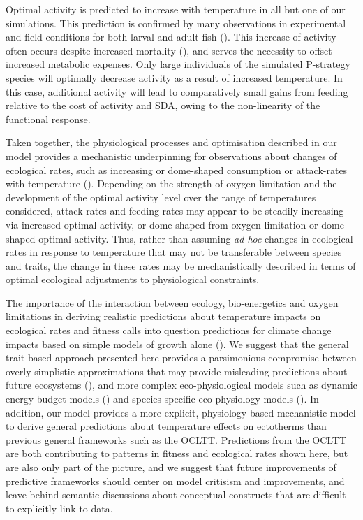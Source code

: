 \documentclass[a4paper, toc=index,abstract=true]{scrartcl}\usepackage[]{graphicx}\usepackage[]{color}
\begin{document}
\begin{spacing}{1.9}
Optimal activity is predicted to increase with temperature in all but one of our simulations. This prediction is confirmed by many observations in experimental and field conditions for both larval and adult fish (\cite{sswat_growth_2018,brown_feeding_1989,claireaux_physiology_1995, biro_mechanisms_2007}). This increase of activity often occurs despite increased mortality (\cite[e.g., ][]{sswat_growth_2018, biro_mechanisms_2007}), and serves the necessity to offset increased metabolic expenses. Only large individuals of the simulated P-strategy species will optimally decrease activity as a result of increased temperature. In this case, additional activity will lead to comparatively small gains from feeding relative to the cost of activity and SDA, owing to the non-linearity of the functional response.


Taken together, the physiological processes and optimisation described in our model provides a mechanistic underpinning for observations about changes of ecological rates, such as
increasing or dome-shaped consumption or attack-rates with temperature
(\cite{biro_mechanisms_2007,englund_temperature_2011,rall_universal_2012}). Depending on the
strength of oxygen limitation and the development of the optimal
activity level over the range of temperatures considered, attack rates
and feeding rates may appear to be steadily increasing via increased
optimal activity, or dome-shaped from oxygen limitation or dome-shaped
optimal activity. Thus, rather than assuming \emph{ad hoc} changes in ecological rates in response to temperature that may not be transferable between species and traits, the change in these rates may be mechanistically described in terms of optimal ecological adjustments to physiological constraints.

The importance of the interaction between ecology, bio-energetics and oxygen limitations in deriving realistic predictions about temperature impacts on ecological rates and fitness calls into question predictions for climate change impacts based on simple models of growth alone (\cite{cheung_shrinking_2013, pauly_sound_2017}). We suggest that the general trait-based approach presented here provides a parsimonious compromise between overly-simplistic approximations that may provide misleading predictions about future ecosystems (\cite{brander_overconfidence_2013, lefevre_models_2017}), and more complex eco-physiological models such as dynamic energy budget models (\cite[e.g., ][]{guiet_effects_2016}) and species specific eco-physiology models (\cite{hufnagl_physiological_2011, holt_climate_2014,holt_climate_2015}). In addition, our model provides a more explicit, physiology-based mechanistic model to derive general predictions about temperature effects on ectotherms than previous general frameworks such as the OCLTT. Predictions from the OCLTT are both contributing to patterns in fitness and ecological rates shown here, but are also only part of the picture, and we suggest that future improvements of predictive frameworks should center on model critisism and improvements, and leave behind semantic discussions about conceptual constructs that are difficult to explicitly link to data.

\end{spacing}
\end{document}
